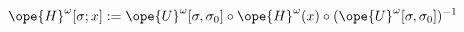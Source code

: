 \begin{equation}	\label{12.106new3}
\ope{H}^\omega[\sigma;x]
:=
\ope{U}^\omega[\sigma,\sigma_0]
\circ \ope{H}^\omega(x) \circ
(\ope{U}^\omega[\sigma,\sigma_0])^{-1}
	\end{equation}


